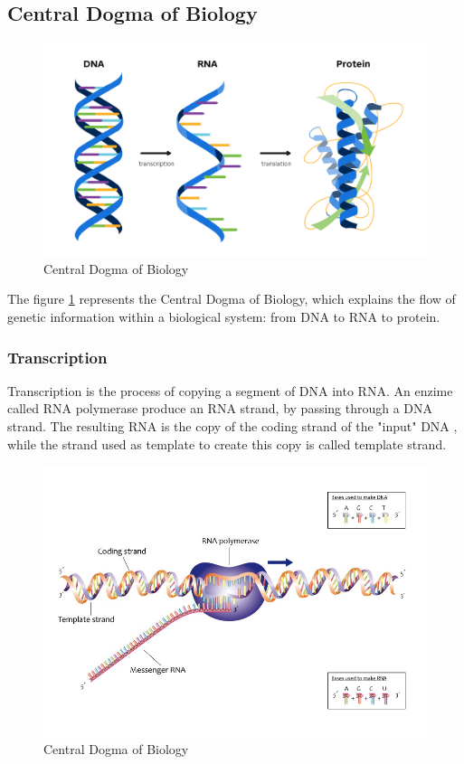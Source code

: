 \subsection{Central Dogma of Biology}
\begin{figure}[h!]
	\includegraphics[scale=.27]{res/proteins_overview/central_dogma.png}
	\centering
	\caption{Central Dogma of Biology}
	\label{fig:central-dogma}
\end{figure}

The figure \ref{fig:central-dogma} represents the Central Dogma of Biology, which explains the flow of genetic information within a biological system: from DNA to RNA to protein.

\pagebreak

\subsubsection{Transcription}
Transcription is the process of copying a segment of DNA into RNA. An enzime called RNA polymerase produce an RNA strand, by passing through a DNA strand. The resulting RNA is the copy of the coding strand of the "input" DNA , while the strand used as template to create this copy is called template strand.

\begin{figure}[h!]
	\includegraphics[scale=.6]{res/proteins_overview/rna_polymerase.jpeg}
	\centering
	\caption{Central Dogma of Biology}
	\label{fig:transcription}
\end{figure}

